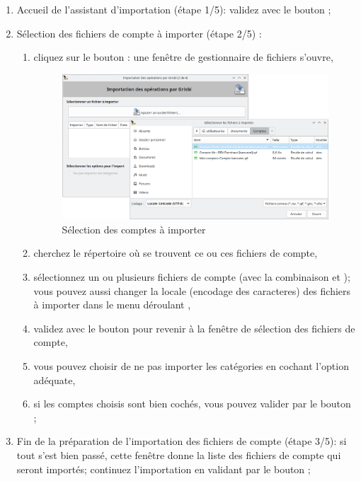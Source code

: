 \begin{enumerate}
	\item Accueil de l'assistant d'importation (étape 1/5): validez avec le bouton ;
	\item Sélection des fichiers de compte à importer (étape 2/5) :	
		\begin{enumerate}
			\item cliquez sur le bouton : une fenêtre de gestionnaire de fichiers s'ouvre,
			\begin{figure}[htbp]
				\raggedleft
					\includegraphics[width=.95\textwidth]{image/screenshot/QIF_import_files_select}
				\caption{Sélection des comptes à importer}
				\label{QIF-import-files-select-img}
			\end{figure}
			\item cherchez le répertoire où se trouvent ce ou ces fichiers de compte,
			\item sélectionnez un ou plusieurs fichiers de compte (avec la combinaison  et ); vous pouvez aussi changer la \gls{locale} (\gls{encodage des caracteres}) des fichiers à importer dans le menu déroulant ,
			\item validez avec le bouton  pour revenir à la fenêtre de sélection des fichiers de compte,
			\item vous pouvez choisir de ne pas importer les catégories en cochant l'option adéquate,
			\item si les comptes choisis sont bien cochés, vous pouvez valider par le bouton ;
		\end{enumerate}
	\item Fin de la préparation de l'importation des fichiers de compte (étape 3/5): si tout s'est bien passé, cette fenêtre donne la liste des fichiers de compte qui seront importés; continuez l'importation en validant par le bouton ;

\end{enumerate}
